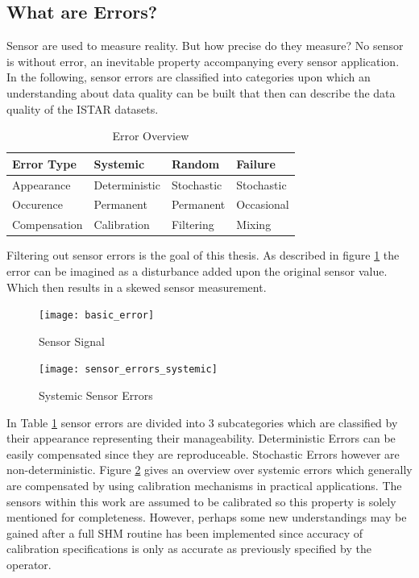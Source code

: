 \newpage

\subsection{What are Errors?}



Sensor are used to measure reality. But how precise do they measure? No sensor is without error, an inevitable property accompanying every sensor application. In the following, sensor errors are classified into categories upon which an understanding about data quality can be built that then can describe the data quality of the ISTAR datasets.
\begin{table}[h]
    \centering
    \begin{tabular}{@{}llll@{}}
        \toprule
        Error Type   & Systemic      & Random     & Failure    \\ \midrule
        Appearance   & Deterministic & Stochastic & Stochastic \\
        Occurence    & Permanent     & Permanent  & Occasional \\
        Compensation & Calibration   & Filtering  & Mixing     \\ \bottomrule
    \end{tabular}
    \caption{Error Overview \cite{hartmann_navigation-sensordatenfusion_2022}}
    \label{tab:error_types}
\end{table}

Filtering out sensor errors is the goal of this thesis. As described in figure \ref{fig:basic_error} the error can be imagined as a disturbance added upon the original sensor value. Which then results in a skewed sensor measurement.

\begin{figure}[ht]
	\centering
	\texttt{[image: basic\_error]}
	\caption{Sensor Signal}
	\label{fig:basic_error}
\end{figure}

\begin{figure}
    \centering
    \vspace{-20pt}
    \texttt{[image: sensor\_errors\_systemic]}
    \caption{Systemic Sensor Errors \cite{hartmann_navigation-sensordatenfusion_2022, din_din_1995}}
    \label{fig:sensor_errors_systemic}

\end{figure}
In Table \ref{tab:error_types} sensor errors are divided into 3 subcategories which are classified by their appearance representing their manageability. Deterministic Errors can be easily compensated since they are reproduceable. Stochastic Errors however are non-deterministic. Figure \ref{fig:sensor_errors_systemic} gives an overview over systemic errors which generally are compensated by using calibration mechanisms in practical applications. The sensors within this work are assumed to be calibrated so this property is solely mentioned for completeness. However, perhaps some new understandings may be gained after a full SHM routine has been implemented since accuracy of calibration specifications is only as accurate as previously specified by the operator.

